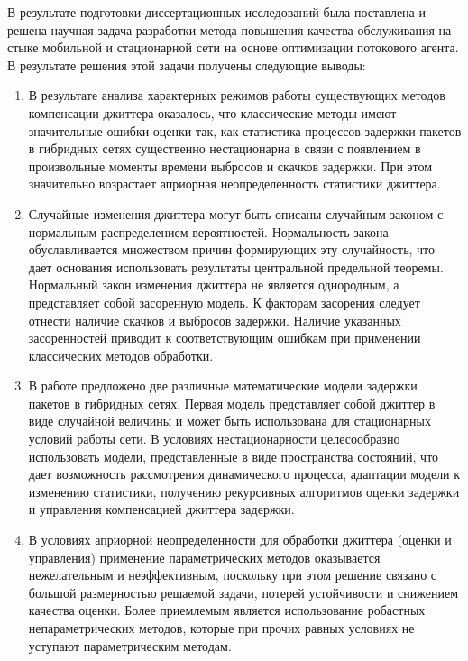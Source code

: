 В результате подготовки диссертационных исследований была поставлена и решена научная задача разработки метода повышения качества обслуживания на стыке мобильной и стационарной сети на основе оптимизации потокового агента.
В результате решения этой задачи получены следующие выводы:
\begin{enumerate}
 \item В результате анализа характерных режимов работы существующих методов компенсации джиттера оказалось, что классические методы имеют значительные ошибки оценки так, как 
 статистика процессов задержки пакетов в гибридных сетях существенно нестационарна в связи с появлением в произвольные моменты времени выбросов и скачков задержки.
 При этом значительно возрастает априорная неопределенность статистики джиттера.
 
 \item Случайные изменения джиттера могут быть описаны случайным законом с нормальным распределением вероятностей.
 Нормальность закона обуславливается множеством причин формирующих эту случайность, что дает основания использовать результаты центральной предельной теоремы.
 Нормальный закон изменения джиттера не является однородным, а представляет собой засоренную модель.
 К факторам засорения следует отнести наличие скачков и выбросов задержки.
 Наличие указанных засоренностей приводит к соответствующим ошибкам при применении классических методов обработки.
 
 \item В работе предложено две различные математические модели задержки пакетов в гибридных сетях.
 Первая модель представляет собой джиттер в виде случайной величины и может быть использована для стационарных условий работы сети.
 В условиях нестационарности целесообразно использовать модели, представленные в виде пространства состояний, 
 что дает возможность рассмотрения динамического процесса, адаптации модели к изменению статистики, получению рекурсивных алгоритмов оценки задержки и управления компенсацией джиттера задержки.
 
 
 \item В условиях априорной неопределенности для обработки джиттера (оценки и управления) применение параметрических методов оказывается нежелательным и неэффективным, поскольку при этом решение связано с большой размерностью решаемой задачи, потерей устойчивости и снижением качества оценки.
 Более приемлемым является использование робастных непараметрических методов, которые при прочих равных условиях не уступают параметрическим методам.
 

\end{enumerate}
